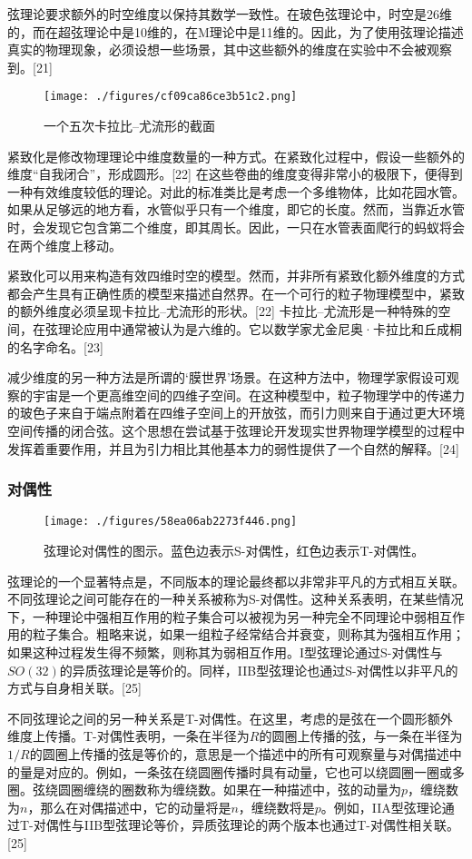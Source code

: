 弦理论要求额外的时空维度以保持其数学一致性。在玻色弦理论中，时空是26维的，而在超弦理论中是10维的，在M理论中是11维的。因此，为了使用弦理论描述真实的物理现象，必须设想一些场景，其中这些额外的维度在实验中不会被观察到。[21]
\begin{figure}[ht]
\centering
\texttt{[image: ./figures/cf09ca86ce3b51c2.png]}
\caption{一个五次卡拉比–尤流形的截面} \label{fig_String_4}
\end{figure}
紧致化是修改物理理论中维度数量的一种方式。在紧致化过程中，假设一些额外的维度“自我闭合”，形成圆形。[22] 在这些卷曲的维度变得非常小的极限下，便得到一种有效维度较低的理论。对此的标准类比是考虑一个多维物体，比如花园水管。如果从足够远的地方看，水管似乎只有一个维度，即它的长度。然而，当靠近水管时，会发现它包含第二个维度，即其周长。因此，一只在水管表面爬行的蚂蚁将会在两个维度上移动。

紧致化可以用来构造有效四维时空的模型。然而，并非所有紧致化额外维度的方式都会产生具有正确性质的模型来描述自然界。在一个可行的粒子物理模型中，紧致的额外维度必须呈现卡拉比–尤流形的形状。[22] 卡拉比–尤流形是一种特殊的空间，在弦理论应用中通常被认为是六维的。它以数学家尤金尼奥·卡拉比和丘成桐的名字命名。[23]

减少维度的另一种方法是所谓的‘膜世界’场景。在这种方法中，物理学家假设可观察的宇宙是一个更高维空间的四维子空间。在这种模型中，粒子物理学中的传递力的玻色子来自于端点附着在四维子空间上的开放弦，而引力则来自于通过更大环境空间传播的闭合弦。这个思想在尝试基于弦理论开发现实世界物理学模型的过程中发挥着重要作用，并且为引力相比其他基本力的弱性提供了一个自然的解释。[24]
\subsubsection{对偶性}
\begin{figure}[ht]
\centering
\texttt{[image: ./figures/58ea06ab2273f446.png]}
\caption{弦理论对偶性的图示。蓝色边表示S-对偶性，红色边表示T-对偶性。} \label{fig_String_5}
\end{figure}
弦理论的一个显著特点是，不同版本的理论最终都以非常非平凡的方式相互关联。不同弦理论之间可能存在的一种关系被称为S-对偶性。这种关系表明，在某些情况下，一种理论中强相互作用的粒子集合可以被视为另一种完全不同理论中弱相互作用的粒子集合。粗略来说，如果一组粒子经常结合并衰变，则称其为强相互作用；如果这种过程发生得不频繁，则称其为弱相互作用。I型弦理论通过S-对偶性与\(SO(32)\)的异质弦理论是等价的。同样，IIB型弦理论也通过S-对偶性以非平凡的方式与自身相关联。[25]

不同弦理论之间的另一种关系是T-对偶性。在这里，考虑的是弦在一个圆形额外维度上传播。T-对偶性表明，一条在半径为\(R\)的圆圈上传播的弦，与一条在半径为\(1/R\)的圆圈上传播的弦是等价的，意思是一个描述中的所有可观察量与对偶描述中的量是对应的。例如，一条弦在绕圆圈传播时具有动量，它也可以绕圆圈一圈或多圈。弦绕圆圈缠绕的圈数称为缠绕数。如果在一种描述中，弦的动量为\(p\)，缠绕数为\(n\)，那么在对偶描述中，它的动量将是\(n\)，缠绕数将是\(p\)。例如，IIA型弦理论通过T-对偶性与IIB型弦理论等价，异质弦理论的两个版本也通过T-对偶性相关联。[25]

